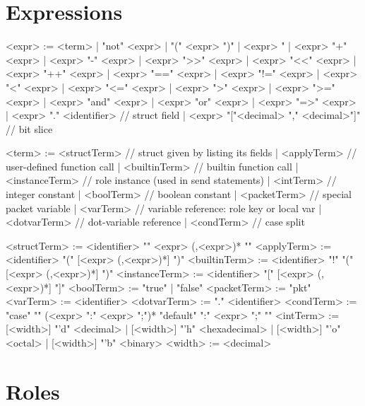 \documentclass{report}
\begin{document}
\section{Expressions}


\begin{bnflisting}{}
<expr> := <term>
        | "not" <expr>
        | "(" <expr> ")"
        | <expr> "%
        | <expr> "+" <expr>
        | <expr> "-" <expr>
        | <expr> ">>" <expr>
        | <expr> "<<" <expr>
        | <expr> "++" <expr>
        | <expr> "==" <expr>
        | <expr> "!=" <expr>
        | <expr> "<" <expr>
        | <expr> "<=" <expr>
        | <expr> ">" <expr>
        | <expr> ">=" <expr>
        | <expr> "and" <expr>
        | <expr> "or" <expr>
        | <expr> "=>" <expr>
        | <expr> "." <identifier> // struct field
        | <expr> "["<decimal> "," <decimal>"]" // bit slice
\end{bnflisting}

\begin{bnflisting}{}
<term> := <structTerm>   // struct given by listing its fields
        | <applyTerm>    // user-defined function call
        | <builtinTerm>  // builtin function call
        | <instanceTerm> // role instance (used in send statements)
        | <intTerm>      // integer constant
        | <boolTerm>     // boolean constant
        | <packetTerm>   // special packet variable
        | <varTerm>      // variable reference: role key or local var
        | <dotvarTerm>   // dot-variable reference
        | <condTerm>     // case split
\end{bnflisting}

\begin{bnflisting}{}
<structTerm>   := <identifier> "{" <expr> (,<expr>)* "}"
<applyTerm>    := <identifier> "(" [<expr> (,<expr>)*] ")"
<builtinTerm>  := <identifier> "!" "(" [<expr> (,<expr>)*] ")"
<instanceTerm> := <identifier> "[" [<expr> (,<expr>)*] "]"
<boolTerm>     := "true" | "false"
<packetTerm>   := "pkt"
<varTerm>      := <identifier>
<dotvarTerm>   := "." <identifier>
<condTerm>     := "case" "{"
                  (<expr> ":" <expr> ";")*
                  "default" ":" <expr> ";"
                  "}"
<intTerm>      := [<width>] "'d" <decimal>
                | [<width>] "'h" <hexadecimal>
                | [<width>] "'o" <octal>
                | [<width>] "'b" <binary>
<width> := <decimal>
\end{bnflisting}

\section{Roles}
\end{document}
